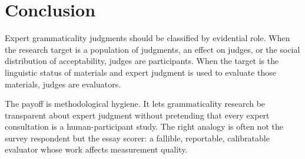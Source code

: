 \section{Conclusion}
\label{sec:conclusion}

Expert grammaticality judgments should be classified by evidential role. When the research target is a population of judgments, an effect on judges, or the social distribution of acceptability, judges are participants. When the target is the linguistic status of materials and expert judgment is used to evaluate those materials, judges are evaluators.

The payoff is methodological hygiene. It lets grammaticality research be transparent about expert judgment without pretending that every expert consultation is a human-participant study. The right analogy is often not the survey respondent but the essay scorer: a fallible, reportable, calibratable evaluator whose work affects measurement quality.
